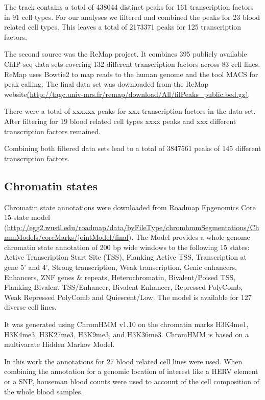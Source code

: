 \documentclass[a4paper,12pt]{article}
\begin{document}
The track contains a total of 438044 distinct peaks for 161 transcription factors in 91 cell types. For our analyses we filtered and combined the peaks for 23 blood related cell types. This leaves a total of 2173371 peaks for 125 transcription factors.  

The second source was the ReMap project\cite{10.1093/nar/gku1280}. It combines 395 publicly available ChIP-seq data sets covering 132 different transcription factors across 83 cell lines. ReMap uses Bowtie2\cite{} to map reads to the human genome and the tool MACS\cite{} for peak calling. The final data set was downloaded from the ReMap website\url{(http://tagc.univ-mrs.fr/remap/download/All/filPeaks_public.bed.gz)}.

There were a total of xxxxxx peaks for xxx transcription factors in the data set. After filtering for 19 blood related cell types xxxx peaks and xxx different transcription factors remained.  

Combining both filtered data sets lead to a total of 3847561 peaks of 145 different transcription factors.


\subsection{Chromatin states}
Chromatin state annotations were downloaded from Roadmap Epgenomics Core 15-state model (\url{http://egg2.wustl.edu/roadmap/data/byFileType/chromhmmSegmentations/ChmmModels/coreMarks/jointModel/final}). The Model provides a whole genome chromatin state annotation of 200 bp wide windows to the following 15 states: Active Transcription Start Site (TSS), Flanking Active TSS, Transcription at gene 5' and 4', Strong transcription, Weak transcription, Genic enhancers, Enhancers, ZNF genes \& repeats, Heterochromatin, Bivalent/Poised TSS, Flanking Bivalent TSS/Enhancer, Bivalent Enhancer, Repressed PolyComb, Weak Repressed PolyComb and Quiescent/Low. The model is available for 127 diverse cell lines. 

It was generated using ChromHMM v1.10\cite{10.1038/nmeth.1906} on the chromatin marks H3K4me1, H3K4me3, H3K27me3, H3K9me3, and H3K36me3. ChromHMM is based on a multivarate Hidden Markov Model. 

In this work the annotations for 27 blood related cell lines were used. When combining the annotation for a genomic location of interest like a HERV element or a SNP, houseman blood counts were used to account of the cell composition of the whole blood samples. 
\end{document}
